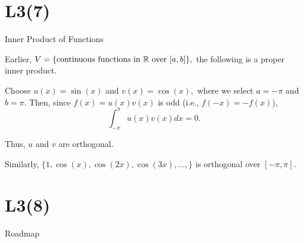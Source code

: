 \documentclass[fleqn,aspectratio=169]{beamer}
\begin{document}
\section{L3(7)}
\begin{frame}{Inner Product of Functions}

\plitemsep 0.2in

\bci 

\item Earlier, $V=\{\text{continuous functions in ${\mathbb R}$ over $[a,b]$} \},$ the following is a proper inner product. 

\item \exam Choose $u(x) = \sin(x)$ and $v(x)= \cos(x),$ where we select $a=-\pi$ and $b=\pi.$ Then, since $f(x) = u(x)v(x)$ is odd (i.e., $f(-x) = -f(x)$), 
$$
\int_{-\pi}^\pi u(x) v(x) dx =0.
$$

\item Thus, $u$ and $v$ are orthogonal. 

\item Similarly, $\{1, \cos(x), \cos(2x), \cos(3x), \ldots,  \}$ is orthogonal over $[-\pi,\pi].$
\eci


\end{frame}



\section{L3(8)}
\begin{frame}{Roadmap}

\plitemsep 0.1in

\bce[(1)] 
\item {}

\item {}

\item {}

\ece
\end{frame}
\end{document}
